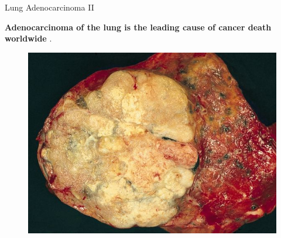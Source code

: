 \documentclass{beamer}
\begin{document}
\begin{frame}{Lung Adenocarcinoma II}
  \begin{block}{}
    \textbf{Adenocarcinoma of the lung is the leading cause of cancer death
      worldwide} \cite{luadmarker}. 
  \end{block}
  \begin{figure}
    \centering
    \includegraphics[scale = 0.25]{img/tumor.jpg}
  \end{figure}
\end{frame}
\end{document}
